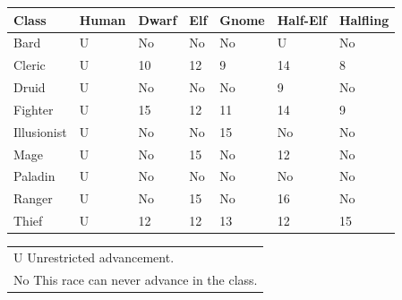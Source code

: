 \noindent
\begin{minipage}{\columnwidth}

\label{classrestrictions}
\noindent
\begin{tabular}{|m{}|m{}|m{}|m{}|m{}|m{}|m{}|}
\hline
Class		& Human	& Dwarf		& Elf	& Gnome	& Half-Elf	& Halfling \\
\hline\hline
\rowcolor[gray]{.9}Bard		& U		& No		& No	& No	& U			& No \\
Cleric		& U		& 10		& 12	& 9		& 14		& 8 \\
\rowcolor[gray]{.9}Druid		& U		& No		& No	& No	& 9			& No \\
Fighter		& U		& 15		& 12	& 11	& 14		& 9 \\
\rowcolor[gray]{.9}Illusionist	& U		& No		& No	& 15	& No		& No \\
Mage		& U		& No		& 15	& No	& 12		& No \\
\rowcolor[gray]{.9}Paladin		& U		& No		& No	& No	& No		& No \\
Ranger		& U		& No		& 15	& No	& 16		& No \\
\rowcolor[gray]{.9}Thief		& U		& 12		& 12	& 13	& 12		& 15 \\
\hline
\end{tabular}
\noindent
\begin{tabular}{p{\textwidth}}
U Unrestricted advancement. \\
No This race can never advance in the class. \\
\end{tabular}\vspace{.5em}

\end{minipage}

\pagebreak

